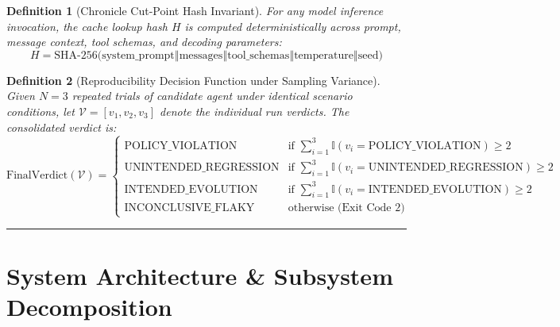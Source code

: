 \documentclass[11pt,a4paper]{article}
\newtheorem{definition}{Definition}
\begin{document}
\begin{definition}[Chronicle Cut-Point Hash Invariant]
For any model inference invocation, the cache lookup hash $H$ is computed deterministically across prompt, message context, tool schemas, and decoding parameters:
\begin{equation}
H = \text{SHA-256}\Big(\text{system\_prompt} \mathbin{\Vert} \text{messages} \mathbin{\Vert} \text{tool\_schemas} \mathbin{\Vert} \text{temperature} \mathbin{\Vert} \text{seed}\Big)
\end{equation}
\end{definition}

\begin{definition}[Reproducibility Decision Function under Sampling Variance]
Given $N=3$ repeated trials of candidate agent under identical scenario conditions, let $\mathcal{V} = [v_1, v_2, v_3]$ denote the individual run verdicts. The consolidated verdict is:
\begin{equation}
\text{FinalVerdict}(\mathcal{V}) = \begin{cases}
\text{POLICY\_VIOLATION} & \text{if } \sum_{i=1}^3 \mathbb{I}(v_i = \text{POLICY\_VIOLATION}) \ge 2 \\
\text{UNINTENDED\_REGRESSION} & \text{if } \sum_{i=1}^3 \mathbb{I}(v_i = \text{UNINTENDED\_REGRESSION}) \ge 2 \\
\text{INTENDED\_EVOLUTION} & \text{if } \sum_{i=1}^3 \mathbb{I}(v_i = \text{INTENDED\_EVOLUTION}) \ge 2 \\
\text{INCONCLUSIVE\_FLAKY} & \text{otherwise (Exit Code 2)}
\end{cases}
\end{equation}
\end{definition}

\vspace{0.8em}
\hrule
\vspace{0.8em}

\section{System Architecture \& Subsystem Decomposition}
\end{document}
